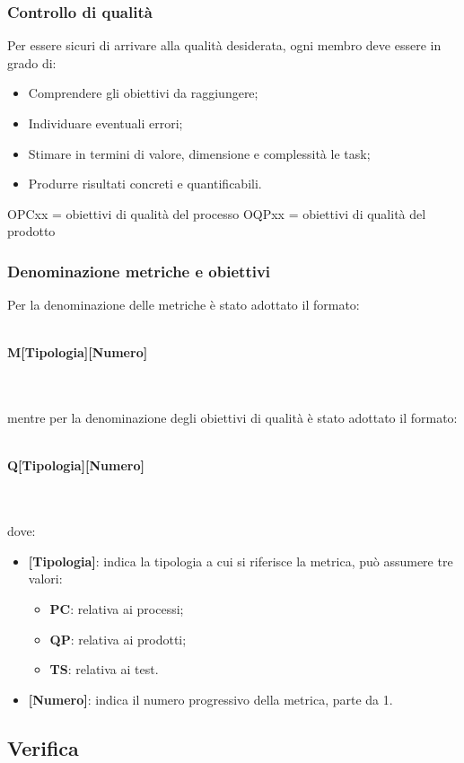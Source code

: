 \subsubsection{Controllo di qualità}
Per essere sicuri di arrivare alla qualità desiderata, ogni membro deve essere in grado di:
\begin{itemize}
\item Comprendere gli obiettivi da raggiungere;
\item Individuare eventuali errori;
\item Stimare in termini di valore, dimensione e complessità le task;
\item Produrre risultati concreti e quantificabili.
\end{itemize}

OPCxx = obiettivi di qualità del processo
OQPxx = obiettivi di qualità del prodotto


\subsubsection{Denominazione metriche e obiettivi}
Per la denominazione delle metriche è stato adottato il formato: \\ \\
\centerline{\textbf{M[Tipologia][Numero]}} \\ \\
mentre per la denominazione degli obiettivi di qualità è stato adottato il formato: \\ \\
\centerline{\textbf{Q[Tipologia][Numero]}} \\ \\
dove:
\begin{itemize}
\item \textbf{[Tipologia]}: indica la tipologia a cui si riferisce la metrica, può assumere tre valori:
    \begin{itemize}
    \item \textbf{PC}: relativa ai processi; 
    \item \textbf{QP}: relativa ai prodotti;
    \item \textbf{TS}: relativa ai test.
    \end{itemize}
\item \textbf{[Numero]}: indica il numero progressivo della metrica, parte da 1.
\end{itemize}	

\subsection{Verifica}
